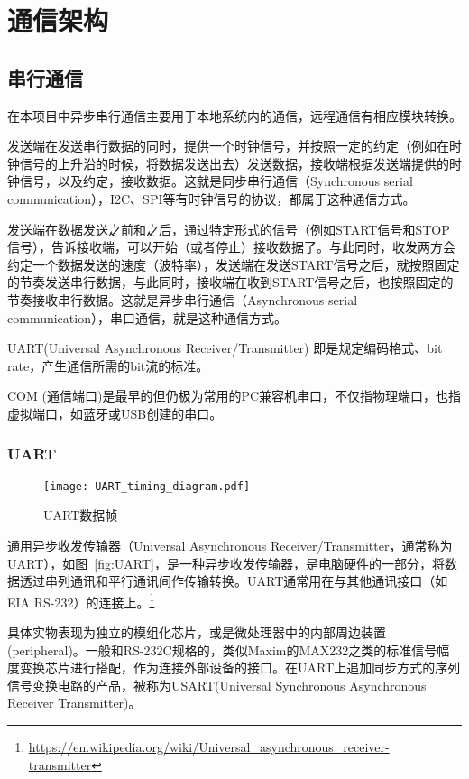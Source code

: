 \chapter{通信架构}
\label{cha:Communication}

\section{串行通信}

在本项目中异步串行通信主要用于本地系统内的通信，远程通信有相应模块转换。

发送端在发送串行数据的同时，提供一个时钟信号，并按照一定的约定（例如在时钟信号的上升沿的时候，将数据发送出去）发送数据，接收端根据发送端提供的时钟信号，以及约定，接收数据。这就是同步串行通信（Synchronous serial communication），I2C、SPI等有时钟信号的协议，都属于这种通信方式。

发送端在数据发送之前和之后，通过特定形式的信号（例如START信号和STOP信号），告诉接收端，可以开始（或者停止）接收数据了。与此同时，收发两方会约定一个数据发送的速度（波特率），发送端在发送START信号之后，就按照固定的节奏发送串行数据，与此同时，接收端在收到START信号之后，也按照固定的节奏接收串行数据。这就是异步串行通信（Asynchronous serial communication），串口通信，就是这种通信方式。

UART(Universal Asynchronous Receiver/Transmitter) 即是规定编码格式、bit rate，产生通信所需的bit流的标准。

COM (通信端口)是最早的但仍极为常用的PC兼容机串口，不仅指物理端口，也指虚拟端口，如蓝牙或USB创建的串口。

\subsection{UART}

\begin{figure}[htbp]
    \centering
    \texttt{[image: UART\_timing\_diagram.pdf]}
    \caption{UART数据帧}
    \label{fig:UART-Data-framing}
\end{figure}

通用异步收发传输器（Universal Asynchronous Receiver/Transmitter，通常称为UART），如图~\ref{fig:UART}，是一种异步收发传输器，是电脑硬件的一部分，将数据透过串列通讯和平行通讯间作传输转换。UART通常用在与其他通讯接口（如EIA RS-232）的连接上。\footnote{\url{https://en.wikipedia.org/wiki/Universal_asynchronous_receiver-transmitter}}

具体实物表现为独立的模组化芯片，或是微处理器中的内部周边装置(peripheral)。一般和RS-232C规格的，类似Maxim的MAX232之类的标准信号幅度变换芯片进行搭配，作为连接外部设备的接口。在UART上追加同步方式的序列信号变换电路的产品，被称为USART(Universal Synchronous Asynchronous Receiver Transmitter)。

